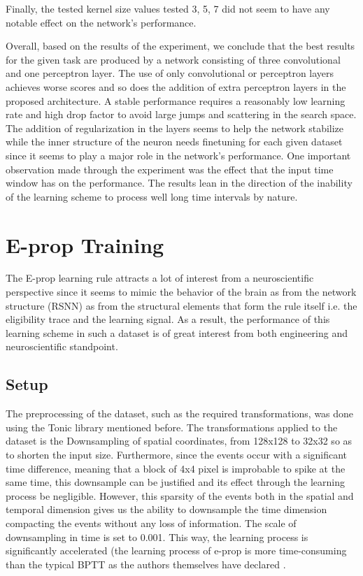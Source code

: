 \documentclass[12pt]{report}
\begin{document}
Finally, the tested kernel size values tested 3, 5, 7 did not seem to have any notable effect on the network's performance.

Overall, based on the results of the experiment, we conclude that the best results for the given task are produced by a network consisting of three convolutional and one perceptron layer. The use of only convolutional or perceptron layers achieves worse scores and so does the addition of extra perceptron layers in the proposed architecture. A stable performance requires a reasonably low learning rate and high drop factor to avoid large jumps and scattering in the search space. The addition of regularization in the layers seems to help the network stabilize while the inner structure of the neuron needs finetuning for each given dataset since it seems to play a major role in the network's performance. One important observation made through the experiment was the effect that the input time window has on the performance. The results lean in the direction of the inability of the learning scheme to process well long time intervals by nature.

\section{E-prop Training}

The E-prop learning rule attracts a lot of interest from a neuroscientific perspective since it seems to mimic the behavior of the brain as from the network structure (RSNN) as from the structural elements that form the rule itself i.e. the eligibility trace and the learning signal. As a result, the performance of this learning scheme in such a dataset is of great interest from both engineering and neuroscientific standpoint.

\subsection{Setup}

The preprocessing of the dataset, such as the required transformations, was done using the Tonic library mentioned before. %
The transformations applied to the dataset is the Downsampling of spatial coordinates, from 128x128 to 32x32 so as to shorten the input size. Furthermore, since the events occur with a significant time difference, meaning that a block of 4x4 pixel is improbable to spike at the same time, this downsample can be justified and its effect through the learning process be negligible. However, this sparsity of the events both in the spatial and temporal dimension gives us the ability to downsample the time dimension compacting the events without any loss of information. The scale of downsampling in time is set to 0.001. This way, the learning process is significantly accelerated (the learning process of e-prop is more time-consuming than the typical BPTT as the authors themselves have declared \cite{Bellec2020}.
\end{document}
